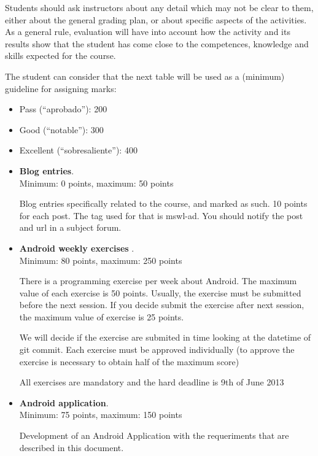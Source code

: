 \documentclass[a4paper]{article}
\begin{document}
Students should ask instructors about any detail which may not be
clear to them, either about the general grading plan, or about
specific aspects of the activities. As a general rule, evaluation will
have into account how the activity and its results show that the
student has come close to the competences, knowledge and skills
expected for the course.

The student can consider that the next table will be used as a
(minimum) guideline for assigning marks:

\begin{itemize}
\item Pass (``aprobado''): 200
\item Good (``notable''): 300
\item Excellent (``sobresaliente''): 400
\end{itemize}

\begin{itemize}
\item \textbf{Blog entries}. \\
  Minimum: 0 points, maximum: 50 points

  Blog entries specifically related to the course, and marked as
  such. 10 points for each post. The tag used for that is mswl-ad.
  You should notify the post and url in a subject forum.

\item \textbf{Android weekly exercises }. \\
  Minimum: 80 points, maximum: 250 points

There is a programming exercise per week about Android. The maximum
value of each exercise is 50 points. Usually, the exercise must be
submitted before the next session. If you decide submit the exercise
after next session, the maximum value of exercise is 25 points.

We will decide if the exercise are submited in time looking at the
datetime of git commit. Each exercise must be approved individually
(to approve the exercise is necessary to obtain half of the maximum score)

All exercises are mandatory and the hard deadline is 9th of June 2013

\item \textbf{Android application}. \\
  Minimum: 75 points, maximum: 150 points

Development of an Android Application with the requeriments that are 
described in this document.

\end{itemize}
\end{document}
